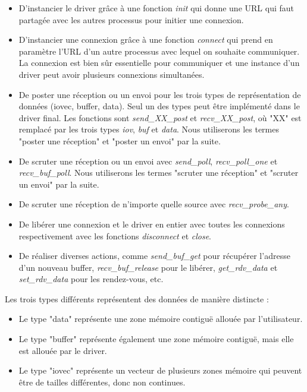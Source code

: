 \begin{itemize}
  \item D'instancier le driver grâce à une fonction \emph{init} qui donne une URL qui faut partagée avec les autres processus pour initier une connexion. %
  \item D'instancier une connexion grâce à une fonction \emph{connect} qui prend en paramètre l'URL d'un autre processus avec lequel on souhaite communiquer.
  La connexion est bien sûr essentielle pour communiquer et une instance d'un driver peut avoir plusieurs connexions simultanées.
  \item De poster une réception ou un envoi pour les trois types de représentation de données (iovec, buffer, data).
  Seul un des types peut être implémenté dans le driver final.
  Les fonctions sont \emph{send_XX_post} et \emph{recv_XX_post}, où "XX" est remplacé par les trois types \emph{iov}, \emph{buf} et \emph{data}.
  Nous utiliserons les termes "poster une réception" et "poster un envoi" par la suite.
  \item De scruter une réception ou un envoi avec \emph{send_poll}, \emph{recv_poll_one} et \emph{recv_buf_poll}.
  Nous utiliserons les termes "scruter une réception" et "scruter un envoi" par la suite.
  \item De scruter une réception de n'importe quelle source avec \emph{recv_probe_any}.
  \item De libérer une connexion et le driver en entier avec toutes les connexions respectivement avec les fonctions \emph{disconnect} et \emph{close}.
  \item De réaliser diverses actions, comme \emph{send_buf_get} pour récupérer l'adresse d'un nouveau buffer,
  \emph{recv_buf_release} pour le libérer, \emph{get_rdv_data} et \emph{set_rdv_data} pour les rendez-vous, etc.
\end{itemize}

Les trois types différents représentent des données de manière distincte :
\begin{itemize}
  \item Le type "data" représente une zone mémoire contiguë allouée par l'utilisateur.
  \item Le type "buffer" représente également une zone mémoire contiguë, mais elle est allouée par le driver.
  \item Le type "iovec" représente un vecteur de plusieurs zones mémoire qui peuvent être de tailles différentes,
  donc non continues.
\end{itemize}

